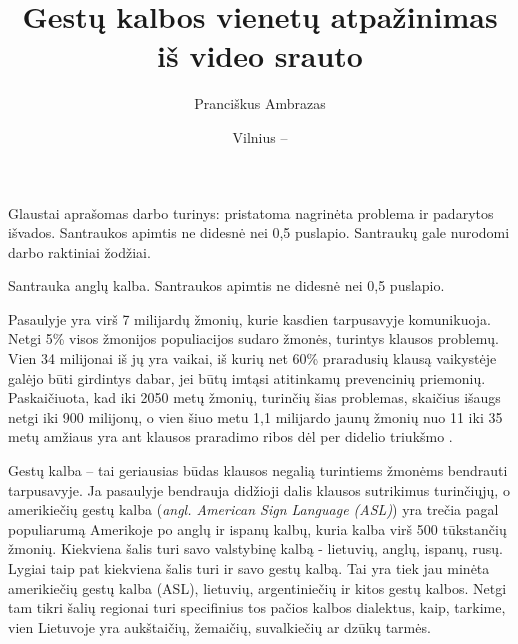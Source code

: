 \documentclass{VUMIFPSbakalaurinis}
\title{Gestų kalbos vienetų atpažinimas iš video srauto}
\author{Pranciškus Ambrazas}
\date{Vilnius – \the\year}
\begin{document}
\maketitle


Glaustai aprašomas darbo turinys: pristatoma nagrinėta problema ir padarytos
išvados. Santraukos apimtis ne didesnė nei 0,5 puslapio. Santraukų gale
nurodomi darbo raktiniai žodžiai. 

Santrauka anglų kalba. Santraukos apimtis ne didesnė nei 0,5 puslapio.

\tableofcontents

Pasaulyje yra virš 7 milijardų žmonių, kurie kasdien tarpusavyje komunikuoja. Netgi 5\% visos žmonijos populiacijos sudaro žmonės, turintys klausos problemų. Vien 34 milijonai iš jų yra vaikai, iš kurių net 60\% praradusių klausą vaikystėje galėjo būti girdintys dabar, jei būtų imtąsi atitinkamų prevencinių priemonių. Paskaičiuota, kad iki 2050 metų žmonių, turinčių šias problemas, skaičius išaugs netgi iki 900 milijonų, o vien šiuo metu 1,1 milijardo jaunų žmonių nuo 11 iki 35 metų amžiaus yra ant klausos praradimo ribos dėl per didelio triukšmo \cite{WhoInt}.

Gestų kalba – tai geriausias būdas klausos negalią turintiems žmonėms bendrauti tarpusavyje. Ja pasaulyje bendrauja didžioji dalis klausos sutrikimus turinčiųjų, o amerikiečių gestų kalba (\textit{angl. American Sign Language (ASL)}) yra trečia pagal populiarumą Amerikoje po anglų ir ispanų kalbų, kuria kalba virš 500 tūkstančių žmonių. Kiekviena šalis turi savo valstybinę kalbą - lietuvių, anglų, ispanų, rusų. Lygiai taip pat kiekviena šalis turi ir savo gestų kalbą. Tai yra tiek jau minėta amerikiečių gestų kalba (ASL), lietuvių, argentiniečių ir kitos gestų kalbos. Netgi tam tikri šalių regionai turi specifinius tos pačios kalbos dialektus, kaip, tarkime, vien Lietuvoje yra aukštaičių, žemaičių, suvalkiečių ar dzūkų tarmės. 
\end{document}
